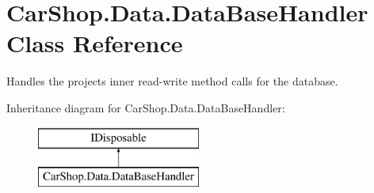 \hypertarget{class_car_shop_1_1_data_1_1_data_base_handler}{}\section{Car\+Shop.\+Data.\+Data\+Base\+Handler Class Reference}
\label{class_car_shop_1_1_data_1_1_data_base_handler}


Handles the projects inner read-\/write method calls for the database.  


Inheritance diagram for Car\+Shop.\+Data.\+Data\+Base\+Handler\+:\begin{figure}[H]
\begin{center}
\leavevmode
\includegraphics[height=2.000000cm]{class_car_shop_1_1_data_1_1_data_base_handler}
\end{center}
\end{figure}

